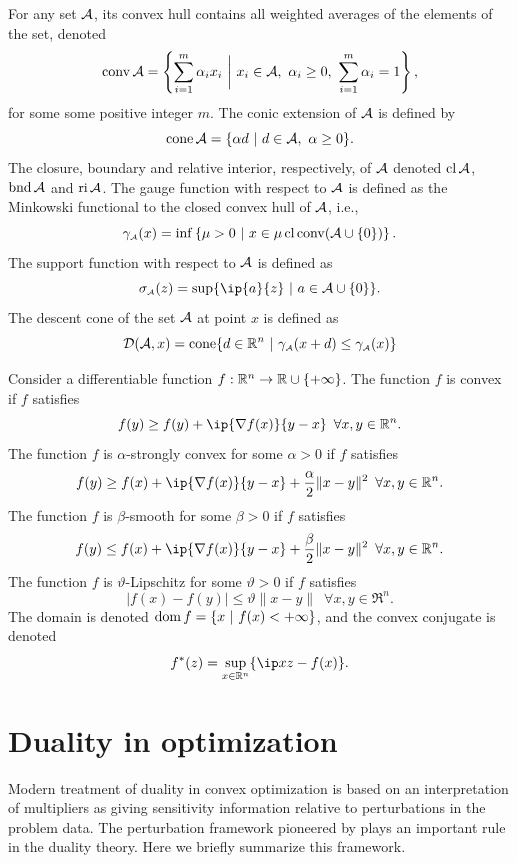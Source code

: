 For any set $\mathcal{A}$, its convex hull contains all
weighted averages of the elements of the set, denoted
\[
  \conv \Ascr =
  \left\{\sum_{i=1}^m \alpha_i x_i ~\bigg\vert~ x_i\in\Ascr,\ \alpha_i\ge0,\ \sum_{i=1}^m\alpha_i=1 \right\},
\]
for some some positive integer $m$. The conic extension of $\mathcal{A}$ is defined by 
\[
  \operatorname{cone}\mathcal{A} = \{\alpha d ~|~ d\in\mathcal{A},\ \alpha\ge0\}.
\]
The closure, boundary and relative interior, respectively,
of $\mathcal{A}$ denoted $\operatorname{cl}\mathcal{A}$, $\operatorname{bnd}\mathcal{A}$ and $\operatorname{ri}\mathcal{A}$. 
The gauge function with respect to $\mathcal{A}$ is defined as the Minkowski functional to the closed convex hull of $\mathcal{A}$, i.e.,
\begin{equation} \label{eq:gauge1}
    \gamma_{\scriptscriptstyle\mathcal{A}}(x) = \inf\left\{\mu > 0 ~|~ x \in \mu\operatorname{cl}\operatorname{conv}(\mathcal{A}\cup\{0\})\right\}.
\end{equation}
The support function with respect to $\mathcal{A}$ is defined as 
\begin{equation} \label{eq:support}
    \sigma\As(z) = \sup\{\ip{a}{z} ~|~ a\in\Ascr\cup\{0\}\}.
\end{equation}
The descent cone of the set $\mathcal{A}$ at point $x$ is defined as 
\[\mathcal{D}(\mathcal{A}, x) = \operatorname{cone}\{d\in \mathbb{R}^n ~|~ \gamma_{\scriptscriptstyle\mathcal{A}}(x + d) \leq \gamma_{\scriptscriptstyle\mathcal{A}}(x)\}\]

Consider a differentiable function $f:\mathbb{R}^n\to\mathbb{R}\cup\{+\infty\}$. The function $f$ is convex if $f$ satisfies
\[f(y) \geq f(y) + \ip{\nabla f(x)}{y-x} \enspace \forall x, y \in \Re^n.\]
The function $f$ is $\alpha$-strongly convex for some $\alpha>0$ if $f$ satisfies
\[f(y) \geq f(x) + \ip{\nabla f(x)}{y-x} + \frac{\alpha}{2}\|x-y\|^2 \enspace \forall x, y \in \Re^n.\]
The function $f$ is $\beta$-smooth for some $\beta>0$ if $f$ satisfies
\[f(y) \leq f(x) + \ip{\nabla f(x)}{y-x} + \frac{\beta}{2}\|x-y\|^2 \enspace \forall x, y \in \Re^n.\]
The function $f$ is $\vartheta$-Lipschitz for some $\vartheta>0$ if $f$ satisfies
\[|f(x) - f(y)| \leq \vartheta\|x-y\| \enspace \forall x, y \in \Re^n.\]
The domain is denoted
$\operatorname{dom} f = \{x~|~f(x)<+\infty\}$, and the convex conjugate is denoted
\[
  f^*(z) = \sup_{x\in\Re^n}\{\ip x z - f(x) \}.
\] 



\section{Duality in optimization} \label{sec:1-2}

Modern treatment of duality in convex optimization is based on an interpretation of multipliers as giving sensitivity information relative to perturbations in the problem data. The perturbation framework pioneered by \citet{rockafellar1970convex} plays an important rule in the duality theory. Here we briefly summarize this framework. 

